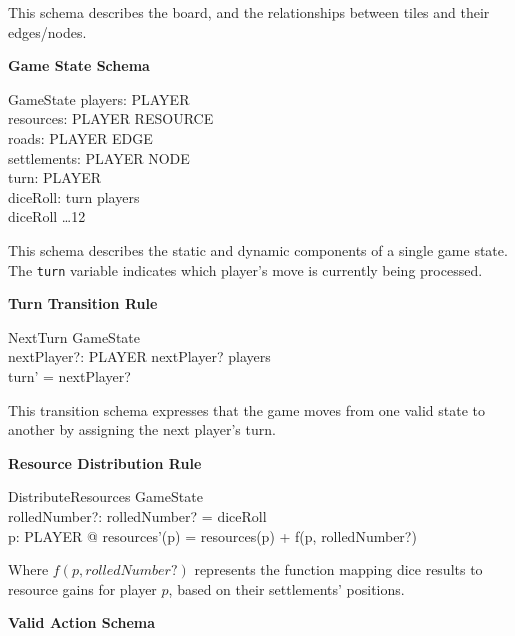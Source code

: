 \documentclass{article}
\begin{document}
This schema describes the board, and the relationships between tiles and their edges/nodes. \newline

\textbf{Game State Schema}

\begin{schema}{GameState}
    players:  PLAYER \\
    resources: PLAYER \fun RESOURCE \pfun {} \\
    roads: PLAYER \fun {} EDGE \\
    settlements: PLAYER \fun {} NODE \\
    turn: PLAYER \\
    diceRoll: 
    \where
    turn \in players \\
    diceRoll  \dots 12
\end{schema}


This schema describes the static and dynamic components of a single game state.
The \texttt{turn} variable indicates which player's move is currently being processed. \newline

\textbf{Turn Transition Rule}

\begin{schema}{NextTurn}
    \Delta GameState \\
    nextPlayer?: PLAYER
    \where
    nextPlayer? \in players \\
    turn' = nextPlayer?
\end{schema}


This transition schema expresses that the game moves from one valid state to another by assigning the next player's turn. \newline

\textbf{Resource Distribution Rule}

\begin{schema}{DistributeResources}
    \Delta GameState \\
    rolledNumber?: 
    \where
    rolledNumber? = diceRoll \\
    \forall p: PLAYER @ resources'(p) = resources(p) + f(p, rolledNumber?)
\end{schema}


Where $f(p, rolledNumber?)$ represents the function mapping dice results to resource gains for player $p$, based on their settlements' positions. \newline

\textbf{Valid Action Schema}
\end{document}
